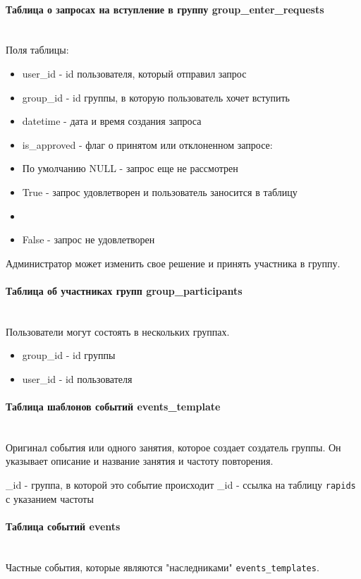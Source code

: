 \documentclass{disser}
\newcommand{\myparagraph}[1]{\paragraph{#1}\mbox{}\\}
\begin{document}
\myparagraph{Таблица о запросах на вступление в группу group\_enter\_requests}


Поля таблицы:

\begin{itemize}
    \item user\_id - id пользователя, который отправил запрос  
    \item group\_id - id группы, в которую пользователь хочет вступить  
    \item datetime - дата и время создания запроса
    \item is\_approved - флаг о принятом или отклоненном запросе: 
\end{itemize}

\begin{itemize}
    \item По умолчанию NULL - запрос еще не рассмотрен
    \item True - запрос удовлетворен и пользователь заносится в таблицу 
    \item {}
    \item False - запрос не удовлетворен
\end{itemize}

Администратор может изменить свое решение и принять участника в группу.

\myparagraph{Таблица об участниках групп group\_participants}

Пользователи могут состоять в нескольких группах.

\begin{itemize}
\item group\_id - id группы  
\item user\_id - id пользователя
\end{itemize}

\myparagraph{Таблица шаблонов событий events\_template}


Оригинал события или одного занятия, которое создает создатель группы. Он указывает описание и название занятия и частоту повторения.

\begin{itemize}
\itemgroup\_id - группа, в которой это событие происходит  
\itemrepeat\_id - ссылка на таблицу \texttt{rapids} с указанием частоты
\end{itemize}

\myparagraph{Таблица событий events}


Частные события, которые являются "наследниками" \texttt{events\_templates}.
\end{document}
